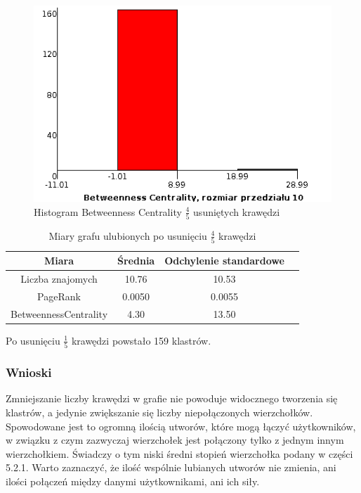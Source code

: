 \documentclass[10pt,a4paper]{article}
\begin{document}
\begin{figure}[H]
\centering
\caption{Histogram Betweenness Centrality $\frac{4}{5}$ usuniętych krawędzi}
\includegraphics[scale=0.6]{wyniki/final200Loved/4200lovedBCHist.png}
\end{figure}


\begin{table}[H]
  \caption{Miary grafu ulubionych po usunięciu $\frac{4}{5}$ krawędzi}
  \centering
    \begin{tabular}{cccc}
    \addlinespace
    \toprule
    Miara & Średnia  & Odchylenie standardowe \\
    \midrule
    Liczba znajomych & 10.76 & 10.53 \\
    PageRank & 0.0050 & 0.0055 \\
    BetweennessCentrality & 4.30 & 13.50\\ 
    \bottomrule
    \end{tabular}
  \label{tab:addlabel}
\end{table}

Po usunięciu $\frac{1}{5}$ krawędzi powstało 159 klastrów. 

\subsubsection {Wnioski}
Zmniejszanie liczby krawędzi w grafie nie powoduje widocznego tworzenia się klastrów, a jedynie zwiększanie się liczby niepołączonych wierzchołków. 
Spowodowane jest to ogromną ilością utworów, które mogą łączyć użytkowników, w związku z czym zazwyczaj wierzchołek jest połączony tylko z jednym innym wierzchołkiem.
Świadczy o tym niski średni stopień wierzchołka podany w części 5.2.1. Warto zaznaczyć, że ilość wspólnie lubianych utworów nie zmienia, ani ilości połączeń między danymi użytkownikami, ani ich siły.
 
\end{document}

